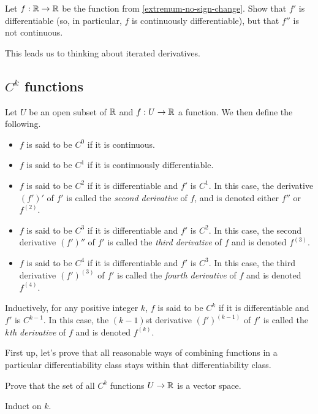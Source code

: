 \begin{exercise} \label{extremum-no-sign-change-continued}
	Let $f : \mathbb{R} \to \mathbb{R}$ be the function from \cref{extremum-no-sign-change}. Show that $f'$ is differentiable (so, in particular, $f$ is continuously differentiable), but that $f''$ is not continuous. 
\end{exercise}

This leads us to thinking about iterated derivatives. 

\subsection{\texorpdfstring{$C^k$}{Ck} functions}

\begin{definition} \label{ck-single} 
	Let $U$ be an open subset of $\mathbb{R}$ and $f : U \to \mathbb{R}$ a function. We then define the following. 
	\begin{itemize}
		\item $f$ is said to be $C^0$ if it is continuous. 
		\item $f$ is said to be $C^1$ if it is continuously differentiable. 
		\item $f$ is said to be $C^2$ if it is differentiable and $f'$ is $C^1$. In this case, the derivative $(f')'$ of $f'$ is called the \emph{second derivative} of $f$, and is denoted either $f''$ or $f^{(2)}$. 
		\item $f$ is said to be $C^3$ if it is differentiable and $f'$ is $C^2$.  In this case, the second derivative $(f')''$ of $f'$ is called the \emph{third derivative} of $f$ and is denoted $f^{(3)}$. 
		\item $f$ is said to be $C^4$ if it is differentiable and $f'$ is $C^3$.  In this case, the third derivative $(f')^{(3)}$ of $f'$ is called the \emph{fourth derivative} of $f$ and is denoted $f^{(4)}$. 
	\end{itemize}
	Inductively, for any positive integer $k$, $f$ is said to be $C^k$ if it is differentiable and $f'$ is $C^{k-1}$.  In this case, the $(k-1)$st derivative $(f')^{(k-1)}$ of $f'$ is called the \emph{$k$th derivative} of $f$ and is denoted $f^{(k)}$.  
\end{definition}

First up, let's prove that all reasonable ways of combining functions in a particular differentiability class stays within that differentiability class. 

\begin{exercise} \label{ck-stable-sum-scalar-single}
	Prove that the set of all $C^k$ functions $U \to \mathbb{R}$ is a vector space. 
	\begin{hint}
		Induct on $k$. 
	\end{hint}
\end{exercise}

